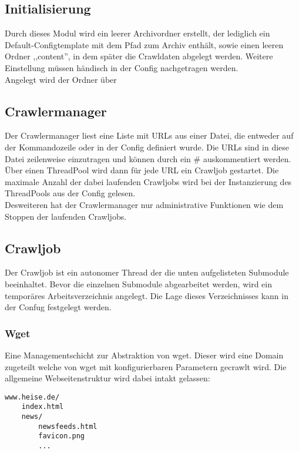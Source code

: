 \subsection{Initialisierung} 
\label{sub:initialisierung}
Durch dieses Modul wird ein leerer Archivordner erstellt, der lediglich
ein Default-Configtemplate mit dem Pfad zum Archiv enthält, sowie einen leeren Ordner ,,content'',
in dem später die Crawldaten abgelegt werden.
Weitere Einstellung müssen händisch in der Config nachgetragen werden.
\\
Angelegt wird der Ordner über %

\subsection{Crawlermanager}
\label{sub:crawlermanager}
Der Crawlermanager liest eine Liste mit URLs aus einer Datei, die entweder auf der Kommandozeile oder in
der Config definiert wurde. Die URLs sind in diese Datei zeilenweise einzutragen und können durch ein \# auskommentiert werden.
Über einen ThreadPool wird dann für jede URL ein Crawljob gestartet. Die maximale Anzahl der dabei laufenden Crawljobs wird bei
der Instanzierung des ThreadPools aus der Config gelesen.
\\
Desweiteren hat der Crawlermanager nur administrative Funktionen wie dem Stoppen der laufenden Crawljobs.

\subsection{Crawljob}
\label{sub:crawljob}
Der Crawljob ist ein autonomer Thread der die unten aufgelisteten Submodule beeinhaltet.
Bevor die einzelnen Submodule abgearbeitet werden, wird ein temporäres Arbeitsverzeichnis angelegt.
Die Lage dieses Verzeichnisses kann in der Confug festgelegt werden.

\subsubsection{Wget}
\label{ssub:wget}
Eine Managementschicht zur Abstraktion von wget.
Dieser wird eine Domain zugeteilt welche von wget mit konfigurierbaren Parametern gecrawlt wird.
Die allgemeine Webseitenstruktur wird dabei intakt gelassen:

\begin{verbatim}
www.heise.de/
    index.html
    news/
        newsfeeds.html
        favicon.png
        ...
\end{verbatim}


